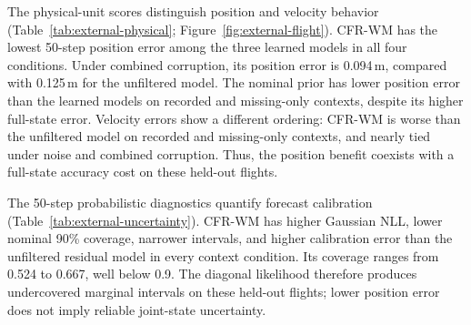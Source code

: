 \documentclass[pdflatex,sn-basic]{sn-jnl}
\newcommand{\ExternalCFRCombinedLongPositionMean}{0.094}
\newcommand{\ExternalUnfilteredCombinedLongPositionMean}{0.125}
\begin{document}
The physical-unit scores distinguish position and velocity behavior
(Table~\ref{tab:external-physical}; Figure~\ref{fig:external-flight}).
CFR-WM has the lowest 50-step position error among the three learned models
in all four conditions. Under combined corruption, its position error is
\ExternalCFRCombinedLongPositionMean{}\,m, compared with
\ExternalUnfilteredCombinedLongPositionMean{}\,m for the unfiltered model.
The nominal prior has lower position error than the learned models on
recorded and missing-only contexts, despite its higher full-state error.
Velocity errors show a different ordering: CFR-WM is worse than the
unfiltered model on recorded and missing-only contexts, and nearly tied
under noise and combined corruption. Thus, the position benefit coexists
with a full-state accuracy cost on these held-out flights.

The 50-step probabilistic diagnostics quantify forecast calibration
(Table~\ref{tab:external-uncertainty}). CFR-WM has higher Gaussian
NLL, lower nominal 90\% coverage, narrower intervals, and higher calibration
error than the unfiltered residual model in every context condition. Its
coverage ranges from 0.524 to 0.667, well below 0.9. The diagonal likelihood
therefore produces undercovered marginal intervals on these held-out flights;
lower position error does not imply reliable joint-state uncertainty.

\begin{table}[t]
\centering
\caption{External flight NRMSE (Equation~\ref{eq:external-score}). Entries
are means $\pm$ SD across five training seeds after equal weighting of three
held-out flights. The nominal forecast is deterministic. All four context
conditions and both horizons are retained.}
\label{tab:external-results}
\end{table}
\end{document}
